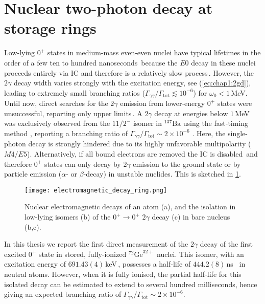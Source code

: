\section{Nuclear two-photon decay at storage rings}\label{sec:chap1:twophotonstorage}
Low-lying $0^{+}$ states in medium-mass even-even nuclei have typical lifetimes in the order of a few ten to hundred nanoseconds\,\cite{Garg-2023} because the $E0$ decay in these nuclei proceeds entirely via IC and therefore is a relatively slow process\,\cite{Kibedi-2022}. However, the $2\gamma$ decay width varies strongly with the excitation energy, see (\cref{eq:chap1:2gd}), leading to extremely small branching ratios ($\Gamma_{\gamma\gamma} / \Gamma_{\mathrm{tot}} \lesssim 10^{-6}$) for $\omega_0<1$\,MeV. Until now, direct searches for the $2\gamma$ emission from lower-energy $0^{+}$ states were unsuccessful, reporting only upper limits\,\cite{Henderson-2014}. A $2\gamma$ decay at energies below $1$\,MeV was exclusively observed from the $11/2^{-}$ isomer in $^{137}\mathrm{Ba}$ using the fast-timing method \cite{Walz-2015,Soederstroem-2020}, reporting a branching ratio of $\Gamma_{\gamma\gamma} / \Gamma_{\mathrm{tot}} \sim 2 \times 10^{-6}$ \cite{Walz-2015}. Here, the single-photon decay is strongly hindered due to its highly unfavorable multipolarity ($M4/E5$).
Alternatively, if all bound electrons are removed the \textsc{IC} is disabled\,\cite{Litvinov-2003} and therefore $0^+$ states can only decay by $2\gamma$ emission to the ground state or by particle emission ($\alpha$- or $\beta$-decay) in unstable nuclides. This is sketched in \cref{fig:chap1:novel_method_sketch}.
\begin{figure}[hbt]
    \texttt{[image: electromagnetic\_decay\_ring.png]}
    \caption{Nuclear electromagnetic decays of an atom (a), and the isolation in low-lying isomers (b) of the $0^+\rightarrow0^+$ $2\gamma$ decay (c) in bare nucleus (b,c).}
    \label{fig:chap1:novel_method_sketch}
\end{figure}
In this thesis we report the first direct measurement of the $2\gamma$ decay of the first excited $0^+$ state in stored, fully-ionized $^{72}\mathrm{Ge}^{32+}$ nuclei. This isomer, with an excitation energy of $691.43\left(4\right)$\,keV\,\cite{ENSDF}, possesses a half-life of $444.2\left(8\right)$\,ns~\cite{BRAUN1984} in neutral atoms. However, when it is fully ionised, the partial half-life for this isolated decay can be estimated to extend to several hundred milliseconds, hence giving an expected branching ratio of $\Gamma_{\gamma\gamma} / \Gamma_{\mathrm{tot}} \sim 2 \times 10^{-6}$. 
